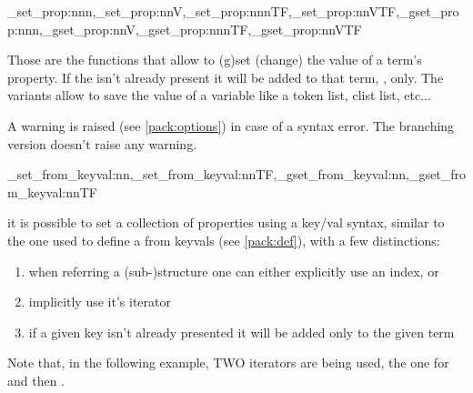 \documentclass[10pt]{article}
\begin{document}
\begin{codedescribe}{\starray_set_prop:nnn,\starray_set_prop:nnV,\starray_set_prop:nnnTF,\starray_set_prop:nnVTF,\starray_gset_prop:nnn,\starray_gset_prop:nnV,\starray_gset_prop:nnnTF,\starray_gset_prop:nnVTF}
\begin{codesyntax}%
\end{codesyntax}
Those are the functions that allow to (g)set (change) the value of a term's property. If the  isn't already present it will be added to that term, , only. The  variants allow to save the value of a variable like a token list, clist list, etc...
\end{codedescribe}

\begin{tsremark}
A warning is raised (see \ref{pack:options}) in case of a  syntax error. The branching version doesn't raise any warning.
\end{tsremark}

\begin{codedescribe}{\starray_set_from_keyval:nn,\starray_set_from_keyval:nnTF,\starray_gset_from_keyval:nn,\starray_gset_from_keyval:nnTF}
\begin{codesyntax}%
\end{codesyntax}
it is possible to set a collection of properties using a key/val syntax, similar to the one used to define a  from keyvals (see \ref{pack:def}), with a few distinctions:
\begin{enumerate}
  \item when referring a (sub-)structure one can either explicitly use an index, or
  \item  implicitly use it's iterator 
  \item if a given key isn't already presented it will be added only to the given term
\end{enumerate}
 Note that, in the following example, TWO iterators are being used, the one for  and then .
\end{codedescribe}
\end{document}
